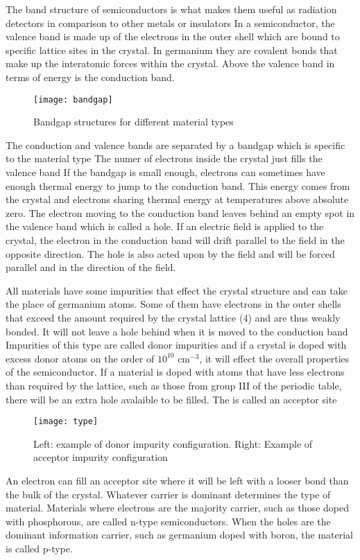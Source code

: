 The band structure of semiconductors is what makes them useful as radiation detectors in comparison to other metals or insulators
In a semiconductor, the valence band is made up of the electrons in the outer shell which are bound to specific lattice sites in the crystal.
In germanium they are covalent bonds that make up the interatomic forces within the crystal.
Above the valence band in terms of energy is the conduction band.
\begin{figure}[htpb]
\centering
\texttt{[image: bandgap]}
\caption{Bandgap structures for different material types}
\label{fig:bandgap}
\end{figure}
The conduction and valence bands are separated by a bandgap which is specific to the material type
The numer of electrons inside the crystal just fills the valence band
If the bandgap is small enough, electrons can sometimes have enough thermal energy to jump to the conduction band.
This energy comes from the crystal and electrons sharing thermal energy at temperatures above absolute zero.
The electron moving to the conduction band leaves behind an empty spot in the valence band which is called a hole.
If an electric field is applied to the crystal, the electron in the conduction band will drift parallel to the field in the opposite direction.
The hole is also acted upon by the field and will be forced parallel and in the direction of the field.

All materials have some impurities that effect the crystal structure and can take the place of germanium atoms.
Some of them have electrons in the outer shells that exceed the amount required by the crystal lattice (4) and are thus weakly bonded.
It will not leave a hole behind when it is moved to the conduction band
Impurities of this type are called donor impurities and if a crystal is doped with excess donor atoms on the order of $10^{10}$ cm$^{-3}$, it will effect the overall properties of the semiconductor.
If a material is doped with atoms that have less electrons than required by the lattice, such as those from group III of the periodic table, there will be an extra hole avalaible to be filled.
The is called an acceptor site
\begin{figure}[htpb]
\centering
\texttt{[image: type]}
\caption{Left: example of donor impurity configuration. Right: Example of acceptor impurity configuration}
\label{fig:type}
\end{figure}
An electron can fill an acceptor site where it will be left with a looser bond than the bulk of the crystal.
Whatever carrier is dominant determines the type of material.
Materials where electrons are the majority carrier, such as those doped with phosphorous, are called n-type semiconductors.
When the holes are the dominant information carrier, such as germanium doped with boron, the material is called p-type.

